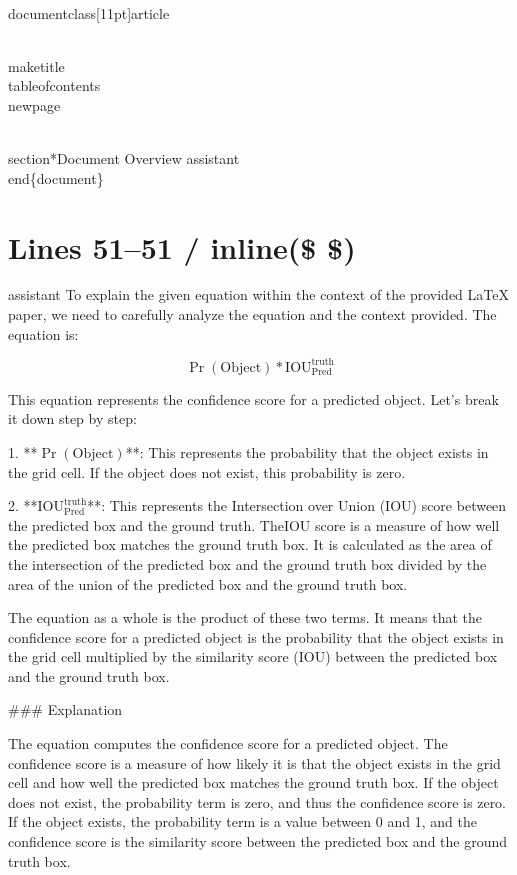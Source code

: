 \\documentclass[11pt]{article}
\begin{document}
\\maketitle
\\tableofcontents
\\newpage

\\section*{Document Overview}
assistant
\\end\{document\}

\newpage

\section*{Lines 51–51 / inline(\$ \$) }
assistant
To explain the given equation within the context of the provided LaTeX paper, we need to carefully analyze the equation and the context provided. The equation is:

\[
\Pr(\textrm{Object}) * \textrm{IOU}_{\textrm{Pred}}^{\textrm{truth}}
\]

This equation represents the confidence score for a predicted object. Let's break it down step by step:

1. **\(\Pr(\textrm{Object})\)**: This represents the probability that the object exists in the grid cell. If the object does not exist, this probability is zero.

2. **\(\textrm{IOU}_{\textrm{Pred}}^{\textrm{truth}}\)**: This represents the Intersection over Union (IOU) score between the predicted box and the ground truth. TheIOU score is a measure of how well the predicted box matches the ground truth box. It is calculated as the area of the intersection of the predicted box and the ground truth box divided by the area of the union of the predicted box and the ground truth box.

The equation as a whole is the product of these two terms. It means that the confidence score for a predicted object is the probability that the object exists in the grid cell multiplied by the similarity score (IOU) between the predicted box and the ground truth box.

### Explanation

The equation computes the confidence score for a predicted object. The confidence score is a measure of how likely it is that the object exists in the grid cell and how well the predicted box matches the ground truth box. If the object does not exist, the probability term is zero, and thus the confidence score is zero. If the object exists, the probability term is a value between 0 and 1, and the confidence score is the similarity score between the predicted box and the ground truth box.
\end{document}
